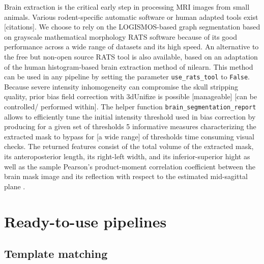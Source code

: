 \documentclass[utf8, a4paper, final, crop]{frontiersSCNS} %
\newcommand{\pythoninline}[1]{\texttt{#1}}
\begin{document}
Brain extraction is the critical early step in processing
MRI images from small animals. Various rodent-specific 
automatic software or human adapted tools exist [citations].
We choose to rely on
the LOGISMOS-based graph segmentation \citep{yin2010logimos} based on grayscale mathematical morphology 
RATS software  \citep{oguz2014rats} because
of its good performance across a wide range of datasets and its high 
speed.
An alternative to the free but non-open source RATS tool is also 
available, based on an adaptation of the 
human histogram-based brain extraction method of nilearn. 
This method can be used in any pipeline by setting the parameter
 \pythoninline{use_rats_tool} to \pythoninline{False}.
Because severe intensity inhomogeneity can compromise
the skull stripping quality, prior bias field correction with
3dUnifize
is possible [manageable] [can be controlled/ performed within].
The helper function \pythoninline{brain_segmentation_report} allows to
efficiently tune the initial intensity threshold used in bias correction by
producing for a given set of thresholds 5 informative measures
characterizing the extracted mask to bypass for [a wide range] of thresholds time 
consuming visual checks.
The returned features %
consist of the total volume of
the extracted mask, its 
anteroposterior length, its right-left width, and its inferior-superior hight as well
as the sample Pearson's product-moment correlation
coefficient between the brain mask image and its reflection
with respect to the estimated mid-sagittal plane
\citep{powell2016fully}.

\section{Ready-to-use pipelines}

\subsection{Template matching}
\end{document}
